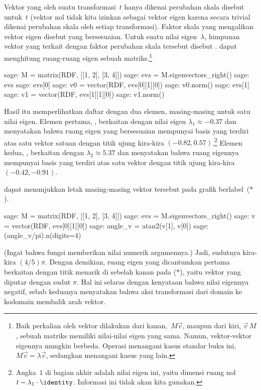 Vektor yang oleh suatu transformasi~$t$ hanya dikenai perubahan skala disebut
 untuk~$t$ (vektor nol tidak kita izinkan sebagai
vektor eigen karena secara trivial dikenai perubahan skala oleh setiap
transformasi).
Faktor skala yang mengalikan vektor eigen disebut  yang
bersesuaian.
Untuk suatu nilai eigen~$\lambda$, himpunan vektor yang terkait dengan faktor
perubahan skala tersebut disebut .
\Sage{} dapat menghitung ruang-ruang eigen sebuah matriks.\footnote{%
  Baik perkalian oleh vektor dilakukan dari kanan,~$M\vec{v}$, maupun dari
  kiri, $\vec{v}\,M$, sebuah matriks memiliki nilai-nilai eigen yang sama.
  Namun, vektor-vektor eigennya mungkin berbeda.
  Operasi \protect\Sage{} \protect{} menangani
  kasus standar buku ini, $M\vec{v}=\lambda\vec{v}$, sedangkan
  \protect{} menangani kasus yang lain.}

\begin{sagecommandline}
sage: M = matrix(RDF, [[1, 2], [3, 4]])
sage: evs = M.eigenvectors_right()
sage: evs
sage: evs[0] 
sage: v0 = vector(RDF, evs[0][1][0])
sage: v0.norm()
sage: evs[1]
sage: v1 = vector(RDF, evs[1][1][0])
sage: v1.norm()
\end{sagecommandline}
Hasil itu memperlihatkan daftar dengan dua elemen, masing-masing untuk satu
nilai eigen.
Elemen pertama, , berkaitan dengan nilai eigen
$\lambda_1\approx -0.37$ dan menyatakan bahwa ruang eigen yang bersesuaian
mempunyai basis yang terdiri atas satu vektor satuan dengan titik ujung kira-kira
$(-0.82, 0.57)$.\footnote{%
  Angka~$1$ di bagian akhir adalah \protect{}
  nilai eigen ini, yaitu dimensi ruang nol
  $t-\lambda_1\cdot\identity$.
  Informasi ini tidak akan kita gunakan.}
Elemen kedua, , berkaitan dengan
$\lambda_2\approx 5.37$ dan menyatakan bahwa ruang eigennya mempunyai basis
yang terdiri atas satu vektor dengan titik ujung kira-kira
$(-0.42, -0.91)$.

\Sage{} dapat menunjukkan letak masing-masing vektor tersebut pada grafik
berlabel~($*$).
\begin{sagecommandline}
sage: M = matrix(RDF, [[1, 2], [3, 4]])
sage: evs = M.eigenvectors_right()
sage: v = vector(RDF, evs[0][1][0])
sage: angle_v = atan2(v[1], v[0]) 
sage: (angle_v/pi).n(digits=4) 
\end{sagecommandline}
(Ingat bahwa fungsi  memberikan nilai numerik argumennya.)
Jadi, sudutnya kira-kira $(4/5)\pi$. Dengan demikian, ruang eigen yang
dicantumkan pertama berkaitan dengan titik menarik di sebelah kanan pada
($*$), yaitu vektor yang diputar dengan sudut $\pi$.
Hal ini selaras dengan kenyataan bahwa nilai eigennya negatif, sebab keduanya
menyatakan bahwa aksi transformasi dari domain ke kodomain membalik arah
vektor.

